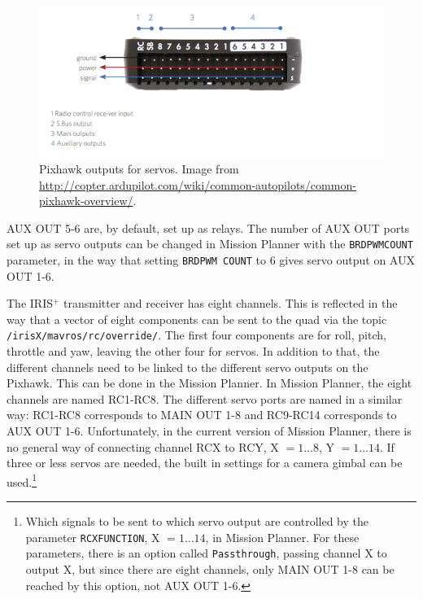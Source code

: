 \documentclass[titlepage,11pt,a4paper]{article}
\begin{document}
\begin{figure}[h!]                                                               
  \centering
  \includegraphics[width=1.0\textwidth]{figures/pixhawk_outputs}
  \caption{Pixhawk outputs for servos. Image from
    \url{http://copter.ardupilot.com/wiki/common-autopilots/common-pixhawk-overview/}.}
  \label{fig:pixhawk_outputs}                                                              
\end{figure}

AUX OUT 5-6 are, by default, set up as relays. The number of AUX OUT
ports set up as servo outputs can be changed in Mission Planner with
the \texttt{BRD\textunderscore PWM\textunderscore COUNT} parameter, in
the way that setting \texttt{BRD\textunderscore PWM\textunderscore
 COUNT} to 6 gives servo output on AUX OUT 1-6.

The IRIS$^+$ transmitter and receiver has eight channels. This is
reflected in the way that a vector of eight components can be sent to
the quad via the topic \texttt{/irisX/mavros/rc/override/}. The first four
components are for roll, pitch, throttle and yaw, leaving the other
four for servos. In addition to that, the different channels need to
be linked to the different servo outputs on the Pixhawk. This can
be done in the Mission Planner. In Mission Planner, the eight channels
are named RC1-RC8. The different servo ports are named in a similar
way: RC1-RC8 corresponds to MAIN OUT 1-8 and RC9-RC14 corresponds to
AUX OUT 1-6. Unfortunately, in the current version of Mission Planner,
there is no general way of connecting channel RCX to RCY, X $= 1 \dots
8$, Y $= 1 \dots 14$. If three or less servos are needed, the built
in settings for a camera gimbal can be used.\footnote{Which signals to
be sent to which servo output are controlled by the parameter
\texttt{RCX\textunderscore FUNCTION}, X $= 1 \dots 14$, in Mission
Planner. For these parameters, there is an option called
\texttt{Passthrough}, passing channel X to output X, but since there
are eight channels, only MAIN OUT 1-8 can be reached by this option,
not AUX OUT 1-6.}
\end{document}
